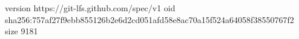 version https://git-lfs.github.com/spec/v1
oid sha256:757af27f9ebb855126b2e6d2cd051afd58e8ac70a15f524a64058f38550767f2
size 9181
